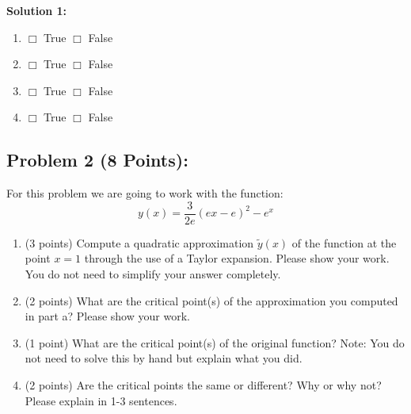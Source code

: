 \documentclass[]{article}
\begin{document}
\textbf{Solution 1:}
\begin{enumerate}[label=(\alph*)]
    \item $\Box$ True \quad \quad $\Box$ False \\
          
    \item $\Box$ True \quad \quad $\Box$ False \\
          
    \item $\Box$ True \quad \quad $\Box$ False \\
          
    \item $\Box$ True \quad \quad $\Box$ False \\
          
\end{enumerate}

\clearpage
\subsection*{Problem 2 (8 Points):}
For this problem we are going to work with the function:
$$y(x) = \frac{3}{2e}(ex-e)^2 - e^x$$
\begin{enumerate}[label=(\alph*)]
    \item (3 points) Compute a quadratic approximation $\tilde{y}(x)$ of the function at the point $x=1$ through the use of a Taylor expansion. Please show your work. You do not need to simplify your answer completely.
    \item (2 points) What are the critical point(s) of the approximation you computed in part a? Please show your work.
    \item (1 point) What are the critical point(s) of the original function?  Note: You do not need to solve this by hand but explain what you did.
    \item (2 points) Are the critical points the same or different? Why or why not? Please explain in 1-3 sentences.
\end{enumerate}
\end{document}
